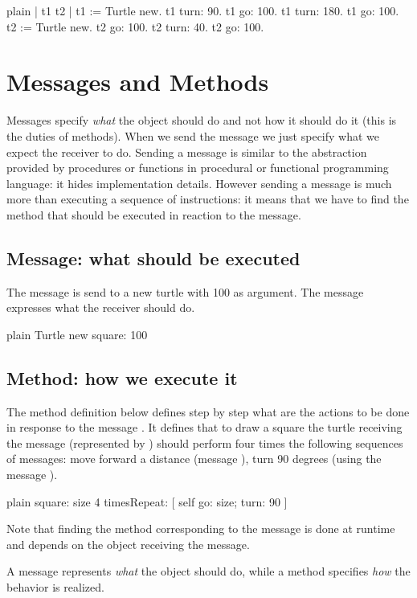 \documentclass[10pt,twoside,english]{_support/latex/sbabook/sbabook}
\begin{document}
\begin{displaycode}{plain}
| t1 t2 |
t1 := Turtle new. 
t1 turn: 90.
t1 go: 100.
t1 turn: 180. 
t1 go: 100.
t2 := Turtle new.
t2 go: 100.
t2 turn: 40.
t2 go: 100.
\end{displaycode}
\section{Messages and Methods}
Messages specify \textit{what} the object should do and not how it should do it (this is the duties of methods). When we send the message  we just specify what we expect the receiver to do.  Sending a message is similar to the abstraction provided by procedures or functions in procedural or functional programming language: it hides implementation details. However sending a message is much more than executing a sequence of instructions: it means that we have to find the method that should be executed in reaction to the message. 
\subsection{Message: what should be executed}
The message  is send to a new turtle with 100 as argument. The message expresses what the receiver should do. 

\begin{displaycode}{plain}
Turtle new square: 100
\end{displaycode}
\subsection{Method: how we execute it}
The method definition  below defines step by step what are the actions to be done in response to the message . It defines that to draw a square the turtle receiving the message  (represented by ) should perform four times the following sequences of messages: move forward a distance (message ), turn 90 degrees (using the message ).

\begin{displaycode}{plain}
square: size
	4 timesRepeat: [ self go: size; turn: 90 ]
\end{displaycode}

Note that finding the method corresponding to the message is done at runtime and depends on the object receiving the message.

\begin{coffee}
A message represents \textit{what} the object should do, while a method specifies \textit{how} the behavior is realized. 
\end{coffee}
\end{document}
